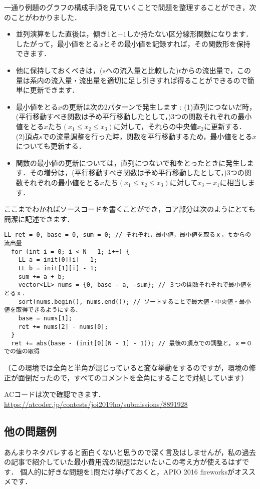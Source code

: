 \documentclass[13pt]{jarticle}
\begin{document}
一通り例題のグラフの構成手順を見ていくことで問題を整理することができ，次のことがわかりました．
\begin{itemize}
\item 並列演算をした直後は，傾き1と$-1$しか持たない区分線形関数になります．したがって，最小値をとる$x$とその最小値を記録すれば，その関数形を保持できます．
\item 他に保持しておくべきは，($s$への流入量と比較した)$t$からの流出量で，この量は系内の流入量・流出量を適切に足し引きすれば得ることができるので簡単に更新できます．
\item 最小値をとる$x$の更新は次の2パターンで発生します : (1)直列につないだ時，(平行移動すべき関数は予め平行移動したとして，)3つの関数それぞれの最小値をとる$x$たち$(x_1 \leq x_2 \leq x_3)$に対して，それらの中央値$x_2$に更新する． (2)頂点$s$での流量調整を行った時，関数を平行移動するため，最小値をとる$x$についても更新する．
\item 関数の最小値の更新については，直列につないで和をとったときに発生します．その増分は，(平行移動すべき関数は予め平行移動したとして，)3つの関数それぞれの最小値をとる$x$たち$(x_1 \leq x_2 \leq x_3)$に対して$x_3 - x_1$に相当します．
\end{itemize}

ここまでわかればソースコードを書くことができ，コア部分は次のようにとても簡潔に記述できます．


\begin{lstlisting}[]  
  LL ret = 0, base = 0, sum = 0; // それぞれ，最小値，最小値を取るｘ，ｔからの流出量
  for (int i = 0; i < N - 1; i++) {
    LL a = init[0][i] - 1;
    LL b = init[1][i] - 1;
    sum += a + b;
    vector<LL> nums = {0, base - a, -sum}; // ３つの関数それぞれで最小値をとるｘ.
    sort(nums.begin(), nums.end()); // ソートすることで最大値・中央値・最小値を取得できるようにする．
    base = nums[1];
    ret += nums[2] - nums[0];
  }
  ret += abs(base - (init[0][N - 1] - 1)); // 最後の頂点での調整と，ｘ＝０での値の取得
\end{lstlisting}
（この環境では全角と半角が混じっていると変な挙動をするのですが，環境の修正が面倒だったので，すべてのコメントを全角にすることで対処しています）

ACコードは次で確認できます．\url{https://atcoder.jp/contests/joi2019ho/submissions/8891928}


\subsection{他の問題例}

あんまりネタバレすると面白くないと思うので深く言及はしませんが，私の過去の記事で紹介していた最小費用流の問題はだいたいこの考え方が使えるはずです．
個人的に好きな問題を1問だけ挙げておくと，APIO 2016 fireworksがオススメです．
\end{document}
